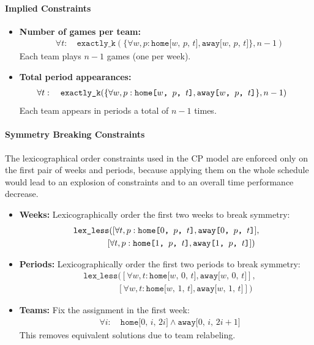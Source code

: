 \documentclass[11pt]{article}
\begin{document}
\paragraph{Implied Constraints}
\begin{itemize}
    \item \textbf{Number of games per team:}
    \begin{align}
        &\forall t: \quad \texttt{exactly\_k}(\{\forall w,p: \texttt{home[$w$, $p$, $t$]}, \texttt{away[$w$, $p$, $t$]}\}, n-1)
    \end{align}
    Each team plays $n-1$ games (one per week).

    \item \textbf{Total period appearances:}
    \begin{align}
        &\forall t: \quad \texttt{exactly\_k}(\{\forall w,p: \space \texttt{home[$w$, $p$, $t$]}, \texttt{away[$w$, $p$, $t$]}\}, n-1)
    \end{align}
    Each team appears in periods a total of $n-1$ times.
\end{itemize}

\paragraph{Symmetry Breaking Constraints}
The lexicographical order constraints used in the CP model are enforced only on the first pair of weeks and periods, because applying them on the whole schedule would lead to an explosion of constraints and to an overall time performance decrease.
\begin{itemize}
    \item \textbf{Weeks:} Lexicographically order the first two weeks to break symmetry:
\begin{align}
    &\texttt{lex\_less}(
        [\forall t, p:\space\texttt{home[$0$, $p$, $t$]}, \texttt{away[$0$, $p$, $t$]}], \\
    &\quad\quad\quad\quad
        [\forall t, p: \texttt{home[$1$, $p$, $t$]}, \texttt{away[$1$, $p$, $t$]}]
    )
\end{align}

\item \textbf{Periods:} Lexicographically order the first two periods to break symmetry:
\begin{align}
    &\texttt{lex\_less}(
        [\forall w, t : \texttt{home[$w$, $0$, $t$]}, \texttt{away[$w$, $0$, $t$]}], \\
    &\quad\quad\quad\quad
        [\forall w, t: \texttt{home[$w$, $1$, $t$]}, \texttt{away[$w$, $1$, $t$]}]
    )
\end{align}


    \item \textbf{Teams:} Fix the assignment in the first week:
    \begin{align}
        &\forall i: \quad \texttt{home[$0$, $i$, $2i$]} \land \texttt{away[$0$, $i$, $2i+1$]}
    \end{align}
    This removes equivalent solutions due to team relabeling.
\end{itemize}
\end{document}

